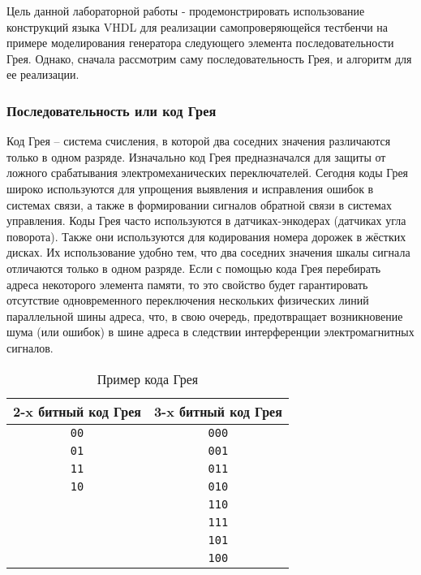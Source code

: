 Цель данной лабораторной работы - продемонстрировать использование конструкций языка VHDL для реализации самопроверяющейся тестбенчи на примере моделирования генератора следующего элемента последовательности Грея. Однако, сначала рассмотрим саму последовательность Грея, и алгоритм для ее реализации.

\subsubsection{Последовательность или код Грея}
 
Код Грея – система счисления, в которой два соседних значения различаются только в одном разряде. Изначально код Грея предназначался для защиты от ложного срабатывания электромеханических переключателей. Сегодня коды Грея широко используются для упрощения выявления и исправления ошибок в системах связи, а также в формировании сигналов обратной связи в системах управления. Коды Грея часто используются в датчиках-энкодерах (датчиках угла поворота). Также они используются для кодирования номера дорожек в жёстких дисках. Их использование удобно тем, что два соседних значения шкалы сигнала отличаются только в одном разряде. Если с помощью кода Грея перебирать адреса некоторого элемента памяти, то это свойство будет гарантировать отсутствие одновременного переключения нескольких физических линий параллельной шины адреса, что, в свою очередь, предотвращает возникновение шума (или ошибок) в шине адреса в следствии интерференции электромагнитных сигналов.  

\begin{table}[h]
\centering
\begin{tabular}{|c|c|}
\hline
2-x битный код Грея & 3-x битный код Грея   \\ \hline
\texttt{00} & \texttt{000} \\
\texttt{01} & \texttt{001} \\
\texttt{11} & \texttt{011} \\
\texttt{10} & \texttt{010} \\
 & \texttt{110} \\
 & \texttt{111} \\
 & \texttt{101} \\
 & \texttt{100} \\

\hline
\end{tabular}\par
\caption{Пример кода Грея}
\label{grey_code_table_0}
\end{table}

